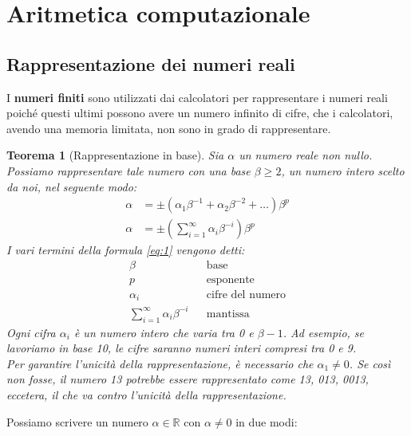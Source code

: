 \documentclass{article}
\newtheorem*{theorem}{\color{green}\textbf{Teorema}}
\begin{document}
\thispagestyle{empty}
\setcounter{page}{0}
\tableofcontents
\newpage

\section{Aritmetica computazionale}
\subsection{Rappresentazione dei numeri reali}
I \textbf{numeri finiti} sono utilizzati dai calcolatori per rappresentare i numeri reali poiché
questi ultimi possono avere un numero infinito di cifre, che i calcolatori, avendo una
memoria limitata, non sono in grado di rappresentare. 

\begin{theorem}[Rappresentazione in base]
    Sia $\alpha$ un numero reale non nullo. Possiamo rappresentare tale numero con una base
    $\beta\geq 2$, un numero intero scelto da noi, nel seguente modo:
    \begin{equation} \label{eq:1}
        \begin{aligned}
            \alpha&=\pm(\alpha_1\beta^{-1}+\alpha_2\beta^{-2}+\ldots)\beta^p \\ 
            \alpha&=\pm(\sum_{i=1}^{\infty}\alpha_i\beta^{-i})\beta^p
        \end{aligned}
    \end{equation}
    I vari termini della formula \ref{eq:1} vengono detti:
    $$\begin{array}{lll}
        \beta & & \text{base} \\ 
        p & & \text{esponente} \\ 
        \alpha_i & & \text{cifre del numero} \\
        \sum_{i=1}^{\infty}\alpha_i\beta^{-i} & & \text{mantissa}
    \end{array}$$
    Ogni cifra $\alpha_i$ è un numero intero che varia tra 0 e $\beta-1$. Ad esempio, se lavoriamo in base
    10, le cifre saranno numeri interi compresi tra 0 e 9.\\ 
    Per garantire l'unicità della rappresentazione, è necessario che $\alpha_1\neq 0$. 
    Se così non fosse, il numero 13 potrebbe essere rappresentato come 13, 013, 0013, eccetera,
    il che va contro l'unicità della rappresentazione.
\end{theorem}
Possiamo scrivere un numero $\alpha\in\mathbb{R}$ con $\alpha\neq 0$ in due modi:
\end{document}
